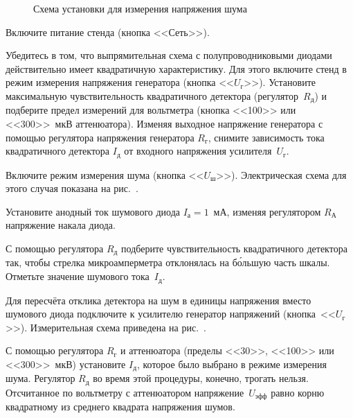 \begin{figure}[h!]
	\caption{Схема установки для измерения напряжения шума}
\end{figure}

\begin{lab:task}


	\item Включите питание стенда (кнопка <<Сеть>>).

	\item Убедитесь в том, что выпрямительная схема с полупроводниковыми диодами
действительно имеет квадратичную
характеристику. Для этого включите стенд в режим измерения напряжения генератора
(кнопка <<$U_{\text{г}}$>>). Установите
максимальную  чувствительность квадратичного детектора
(регулятор~$R_{\text{д}}$) и подберите предел измерений для вольтметра
(кнопка <<100>> или <<300>>~мкВ аттенюатора). Изменяя выходное напряжение
генератора с помощью регулятора напряжения
генератора $R_{г}$, снимите зависимость тока квадратичного детектора
$I_{\text{д}}$ от входного напряжения усилителя~$U_{\text{г}}$.


	\item Включите режим измерения шума (кнопка <<$U_{ш}$>>).
Электрическая схема для этого случая показана на рис.~.

	\item Установите анодный ток шумового диода $I_{а}=1$~мА, изменяя
регулятором $R_{А}$ напряжение накала диода.

С помощью регулятора $R_{д}$ подберите чувствительность квадратичного
детектора так, чтобы стрелка микроамперметра
отклонялась на б\'{о}льшую часть шкалы. Отметьте значение шумового
тока~$I_{д}$.

Для пересчёта отклика детектора на шум в единицы напряжения вместо шумового
диода подключите к усилителю генератор напряжений (кнопка~<<$U_{г}$>>).
Измерительная схема приведена на рис.~.

С помощью регулятора $R_{г}$ и аттенюатора (пределы <<30>>, <<100>> или
<<300>>~мкВ) установите  $I_{д}$,
которое было выбрано в режиме измерения шума. Регулятор $R_{д}$ во время
этой процедуры, конечно, трогать нельзя. Отсчитанное по вольтметру
с аттенюатором напряжение~$U_{эфф}$ равно корню квадратному из среднего
квадрата напряжения шумов.


\end{lab:task}
